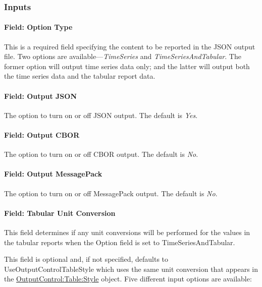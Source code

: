 \subsubsection{Inputs}

\paragraph{Field: Option Type}
This is a required field specifying the content to be reported in the JSON output file. Two options are available---\emph{TimeSeries} and \emph{TimeSeriesAndTabular}. The former option will output time series data only; and the latter will output both the time series data and the tabular report data.

\paragraph{Field: Output JSON}
The option to turn on or off JSON output. The default is \emph{Yes}.

\paragraph{Field: Output CBOR}
The option to turn on or off CBOR output. The default is \emph{No}.

\paragraph{Field: Output MessagePack}
The option to turn on or off MessagePack output. The default is \emph{No}.

\paragraph{Field: Tabular Unit Conversion}\label{field-tabular-unit-conversion-json}

This field determines if any unit conversions will be performed for the values in the tabular reports when the Option field is set to TimeSeriesAndTabular.

This field is optional and, if not specified, defaults to UseOutputControlTableStyle which uses the same unit conversion that appears in the   \hyperref[outputcontroltablestyle]{OutputControl:Table:Style}
 object. Five different input options are available:

